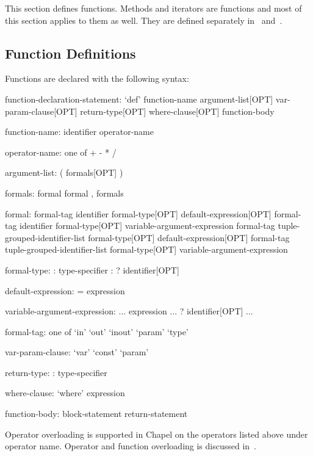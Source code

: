 \label{Functions}

This section defines functions.  Methods and iterators are functions
and most of this section applies to them as well.  They are defined
separately in~ and~.

\subsection{Function Definitions}
\label{Function_Definitions}

Functions are declared with the following syntax:
\begin{syntax}
function-declaration-statement:
  `def' function-name argument-list[OPT] var-param-clause[OPT]
    return-type[OPT] where-clause[OPT] function-body

function-name:
  identifier
  operator-name

operator-name: one of
  + - * / %

argument-list:
  ( formals[OPT] )

formals:
  formal
  formal , formals

formal:
  formal-tag identifier formal-type[OPT] default-expression[OPT]
  formal-tag identifier formal-type[OPT] variable-argument-expression
  formal-tag tuple-grouped-identifier-list formal-type[OPT] default-expression[OPT]
  formal-tag tuple-grouped-identifier-list formal-type[OPT] variable-argument-expression

formal-type:
  : type-specifier
  : ? identifier[OPT]

default-expression:
  = expression

variable-argument-expression:
  ... expression
  ... ? identifier[OPT]
  ...

formal-tag: one of
  `in' `out' `inout' `param' `type'

var-param-clause:
  `var'
  `const'
  `param'

return-type:
  : type-specifier

where-clause:
  `where' expression

function-body:
  block-statement
  return-statement
\end{syntax}

Operator overloading is supported in Chapel on the operators listed
above under operator name.  Operator and function overloading is
discussed in~.

